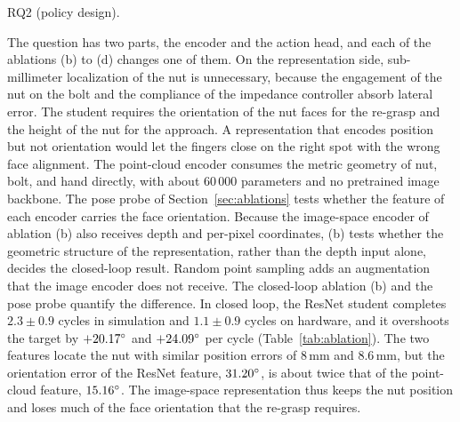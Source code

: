\begin{description}
  \item[RQ2 (policy design).] \RQtwo
\end{description}
The question has two parts, the encoder and the action head, and each of the ablations (b) to (d) changes one of them. On the representation side, sub-millimeter localization of the nut is unnecessary, because the engagement of the nut on the bolt and the compliance of the impedance controller absorb lateral error. The student requires the orientation of the nut faces for the re-grasp and the height of the nut for the approach. A representation that encodes position but not orientation would let the fingers close on the right spot with the wrong face alignment. The point-cloud encoder consumes the metric geometry of nut, bolt, and hand directly, with about 60\,000 parameters and no pretrained image backbone. The pose probe of Section~\ref{sec:ablations} tests whether the feature of each encoder carries the face orientation. Because the image-space encoder of ablation (b) also receives depth and per-pixel coordinates, (b) tests whether the geometric structure of the representation, rather than the depth input alone, decides the closed-loop result. Random point sampling adds an augmentation that the image encoder does not receive. The closed-loop ablation (b) and the pose probe quantify the difference. In closed loop, the ResNet student completes $2.3\pm0.9$ cycles in simulation and $1.1\pm0.9$ cycles on hardware, and it overshoots the target by $+20.17^\circ$ and $+24.09^\circ$ per cycle (Table~\ref{tab:ablation}). The two features locate the nut with similar position errors of 8\,mm and 8.6\,mm, but the orientation error of the ResNet feature, $31.20^\circ$, is about twice that of the point-cloud feature, $15.16^\circ$. The image-space representation thus keeps the nut position and loses much of the face orientation that the re-grasp requires.

